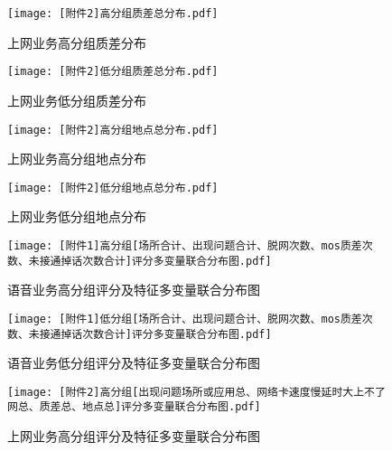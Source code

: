 \documentclass{MathorCupmodeling}
\begin{document}
	\begin{figure}[H]
		\centering
		\begin{minipage}{0.48\linewidth}
			\centering
			\texttt{[image: [附件2]高分组质差总分布.pdf]}
			\caption{上网业务高分组质差分布}
			\label{fig:上网业务高分组质差分布}
		\end{minipage}
		\begin{minipage}{0.48\linewidth}
			\centering
			\texttt{[image: [附件2]低分组质差总分布.pdf]}
			\caption{上网业务低分组质差分布}
			\label{fig:上网业务低分组质差分布}
		\end{minipage}
	\end{figure}
	\begin{figure}[H]
		\centering
		\begin{minipage}{0.48\linewidth}
			\centering
			\texttt{[image: [附件2]高分组地点总分布.pdf]}
			\caption{上网业务高分组地点分布}
			\label{fig:上网业务高分组地点分布}
		\end{minipage}
		\begin{minipage}{0.48\linewidth}
			\centering
			\texttt{[image: [附件2]低分组地点总分布.pdf]}
			\caption{上网业务低分组地点分布}
			\label{fig:上网业务低分组地点分布}
		\end{minipage}
	\end{figure}
	\begin{figure}[H]
		\centering
			\centering
			\texttt{[image: [附件1]高分组[场所合计、出现问题合计、脱网次数、mos质差次数、未接通掉话次数合计]评分多变量联合分布图.pdf]}
			\caption{语音业务高分组评分及特征多变量联合分布图}
			\label{fig:语音业务高分组评分及特征多变量联合分布图}
	\end{figure}	
	\begin{figure}[H]
		\centering
			\centering
			\texttt{[image: [附件1]低分组[场所合计、出现问题合计、脱网次数、mos质差次数、未接通掉话次数合计]评分多变量联合分布图.pdf]}
			\caption{语音业务低分组评分及特征多变量联合分布图}
			\label{fig:语音业务低分组评分及特征多变量联合分布图}
	\end{figure}
	\begin{figure}[H]
		\centering
			\centering
			\texttt{[image: [附件2]高分组[出现问题场所或应用总、网络卡速度慢延时大上不了网总、质差总、地点总]评分多变量联合分布图.pdf]}
			\caption{上网业务高分组评分及特征多变量联合分布图}
			\label{fig:上网业务高分组评分及特征多变量联合分布图}
	\end{figure}	
\end{document}
